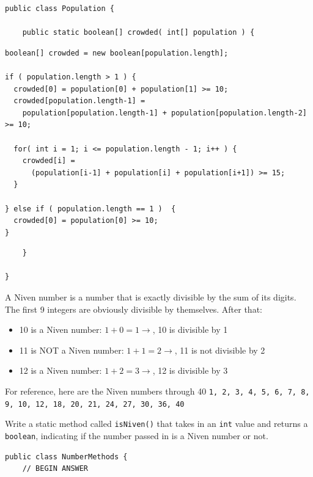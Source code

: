 \documentclass[11pt,answers]{exam}
\begin{document}
\begin{questions}
\newpage
\begin{verbatim}
public class Population {
    
    public static boolean[] crowded( int[] population ) {	
\end{verbatim}

\begin{solution}[6in]
\begin{lstlisting}
boolean[] crowded = new boolean[population.length];

if ( population.length > 1 ) {
  crowded[0] = population[0] + population[1] >= 10;
  crowded[population.length-1] = 
    population[population.length-1] + population[population.length-2] >= 10;

  for( int i = 1; i <= population.length - 1; i++ ) {
    crowded[i] = 
      (population[i-1] + population[i] + population[i+1]) >= 15;
  }

} else if ( population.length == 1 )  {
  crowded[0] = population[0] >= 10;
}	
\end{lstlisting}  
\end{solution}

\begin{verbatim}
    }

}	
\end{verbatim}

\newpage

\question[5] A Niven number is a number that is exactly divisible by the sum of its digits.   The first 9 integers are obviously divisible by themselves.   After that:
\begin{itemize}
	\item 10 is a Niven number: $1 + 0 = 1 \rightarrow$, 10 is divisible by 1
	\item 11 is NOT a Niven number: $1 + 1 = 2 \rightarrow$, 11 is not divisible by 2
	\item 12 is a Niven number: $1 + 2 = 3 \rightarrow$, 12 is divisible by 3
\end{itemize}
For reference, here are the Niven numbers through 40 \newline
{\tt 1, 2, 3, 4, 5, 6, 7, 8, 9, 10, 12, 18, 20, 21, 24, 27, 30, 36, 40} \newline

\par
Write a static method called {\tt isNiven()} that takes in an {\tt int} value and returns a {\tt boolean}, indicating if the number passed in is a Niven number or not.  

\begin{verbatim}
public class NumberMethods {
    // BEGIN ANSWER
\end{verbatim}


\end{questions}
\end{document}
